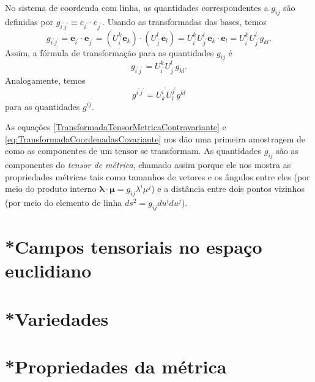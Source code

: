 No sistema de coordenda com linha, as quantidades correspondentes a $g_{ij}$ são definidas por $g_{i^{\prime} j^{\prime}} \equiv e_{i^{\prime}} \cdot e_{j^{\prime}}$. Usando as transformadas das bases, temos
\[
	g_{i^{\prime} j^{\prime}}=\mathbf{e}_{i^{\prime}} \cdot \mathbf{e}_{j^{\prime}}=\left(U_{i^{\prime}}^{k} \mathbf{e}_{k}\right) \cdot\left(U_{j^{\prime}}^{l} \mathbf{e}_{l}\right)=U_{i^{\prime}}^{k} U_{j^{\prime}}^{l} \mathbf{e}_{k} \cdot \mathbf{e}_{l}=U_{i^{\prime}}^{k} U_{j^{\prime}}^{l} g_{k l} .
\]
Assim, a fórmula de transformação para as quantidades $g_{ij}$ é
\begin{equation}\label{TransformadaTensorMetricaContravariante}
	\boxed{
		g_{i^{\prime} j^{\prime}}=U_{i^{\prime}}^{k} U_{j^{\prime}}^{l} g_{k l} .
	}
\end{equation}
Analogamente, temos
\begin{equation}\label{TransformadaTensorMetricaCovariante}
	\boxed{
		g^{i^{\prime} j^{\prime}}=U^{i^{\prime}}_{k} U^{j^{\prime}}_{l} g^{k l} 
	}
\end{equation}
para as quantidades $g^{ij}$.

As equações \eqref{TransformadaTensorMetricaContravariante} e \eqref{eq:TransformadaCoordenadasCovariante} nos dão uma primeira amostragem de como as componentes de um tensor se transformam. As quantidades $g_{ij}$ são as componentes do \textit{tensor de métrica}, chamado assim porque ele nos mostra as propriedades métricas tais como tamanhos de vetores e os ângulos entre eles (por meio do produto interno $\boldsymbol{\lambda}\cdot\boldsymbol{\mu}=g_{ij}\lambda^i\mu^j$) e a distância entre dois pontos vizinhos (por meio do elemento de linha $ds^2=g_{ij}du^idu^j$).





\section{*Campos tensoriais no espaço euclidiano}\label{sec:CamposTensoriais}

\section{*Variedades}\label{sec:Variedades}


\section{*Propriedades da métrica}\label{sec:Metrica}